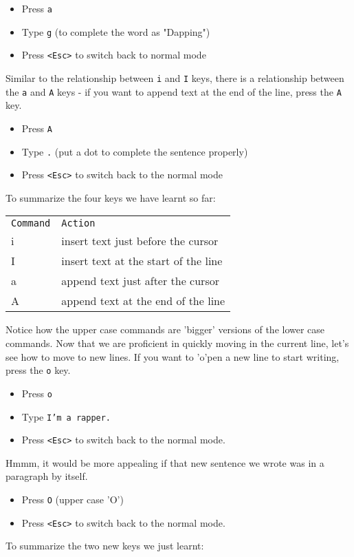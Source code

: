 \begin{itemize}
\item Press \texttt{a} 
\item Type \texttt{g} (to complete the word as "Dapping") 
\item Press \texttt{<Esc>} to switch back to normal mode 
\end{itemize}
Similar to the relationship between \texttt{i} and \texttt{I} keys, there is a
relationship between the \texttt{a} and \texttt{A} keys - if you want to append
text at the end of the line, press the \texttt{A} key. 
\begin{itemize}
\item Press \texttt{A} 
\item Type \texttt{.} (put a dot to complete the sentence properly) 
\item Press \texttt{<Esc>} to switch back to the normal mode 
\end{itemize}

To summarize the four keys we have learnt so far: 
\begin{tabular}{l l} 
\hline 
\texttt{Command} & \texttt{Action} \\  
i & insert text just before the cursor \\ 
I & insert text at the start of the line \\ 
a & append text just after the cursor \\ 
A & append text at the end of the line \\
\hline
\end{tabular}
Notice how the upper case commands are 'bigger' versions of the lower case
commands. Now that we are proficient in quickly moving in the current line,
let's see how to move to new lines. If you want to 'o'pen a new line to start
writing, press the \texttt{o} key. 
\begin{itemize}
\item Press \texttt{o} 
\item Type \texttt{I'm a rapper.} 
\item Press \texttt{<Esc>} to switch
back to the normal mode. 
\end{itemize}

Hmmm, it would be more appealing if that new sentence
we wrote was in a paragraph by itself. 
\begin{itemize}
\item Press \texttt{O} (upper case 'O') 
\item Press \texttt{<Esc>} to switch back to the normal mode. 
\end{itemize}
To summarize the two new keys we just learnt: 

